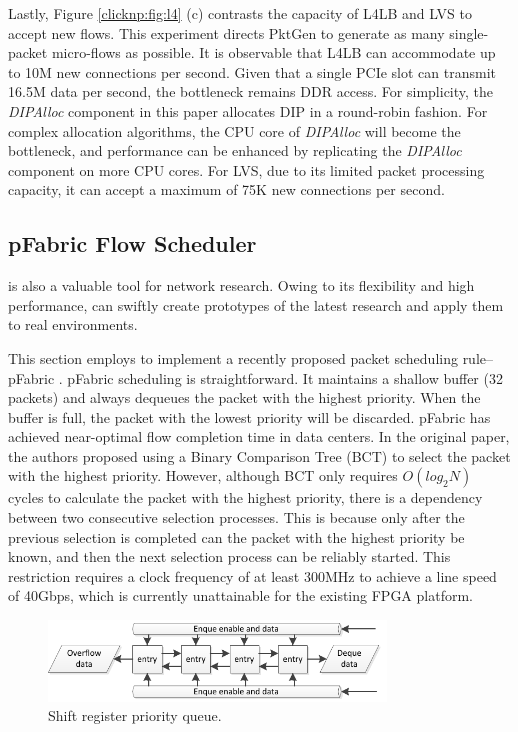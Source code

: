 Lastly, Figure \ref {clicknp:fig:l4} (c) contrasts the capacity of L4LB and LVS to accept new flows.
This experiment directs PktGen to generate as many single-packet micro-flows as possible.
It is observable that L4LB can accommodate up to 10M new connections per second.
Given that a single PCIe slot can transmit 16.5M data per second, the bottleneck remains DDR access.
For simplicity, the \textit {DIPAlloc} component in this paper allocates DIP in a round-robin fashion.
For complex allocation algorithms, the CPU core of \textit {DIPAlloc} will become the bottleneck, and performance can be enhanced by replicating the \textit {DIPAlloc} component on more CPU cores.
For LVS, due to its limited packet processing capacity, it can accept a maximum of 75K new connections per second.

\subsection{pFabric Flow Scheduler}

\name is also a valuable tool for network research.
Owing to its flexibility and high performance, \name can swiftly create prototypes of the latest research and apply them to real environments.

This section employs \name to implement a recently proposed packet scheduling rule--pFabric \cite {pfabric}.
pFabric scheduling is straightforward. It maintains a shallow buffer (32 packets) and always dequeues the packet with the highest priority. When the buffer is full, the packet with the lowest priority will be discarded.
pFabric has achieved near-optimal flow completion time in data centers.
In the original paper, the authors proposed using a Binary Comparison Tree (BCT) to select the packet with the highest priority.
However, although BCT only requires $O(log_2 N)$ cycles to calculate the packet with the highest priority, there is a dependency between two consecutive selection processes. This is because only after the previous selection is completed can the packet with the highest priority be known, and then the next selection process can be reliably started.
This restriction requires a clock frequency of at least 300MHz to achieve a line speed of 40Gbps, which is currently unattainable for the existing FPGA platform.

\begin{figure}[htbp]
	\centering
	\includegraphics[width=0.8\textwidth]{image/PriorityQueue}
	\caption{Shift register priority queue.}
	\label{clicknp:fig:ShiftRegPrioQueue}
\end{figure}

